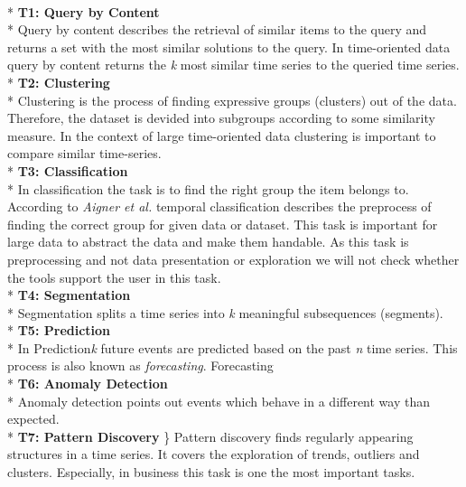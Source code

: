 \\*
\textbf{T1: Query by Content}
\\*
Query by content describes the retrieval of similar items to the query and returns a set with the most similar solutions to the query. In time-oriented data query by content returns the \textit{k} most similar time series to the queried time series.
\\*
\textbf{T2: Clustering}\\*
Clustering is the process of finding expressive groups (clusters) out of the data. Therefore, the dataset is devided into subgroups according to some similarity measure. In the context of large time-oriented data clustering is important to compare similar time-series.
\\*
\textbf{T3: Classification}\\*
In classification the task is to find the right group the item belongs to. According to \textit{Aigner et al.} temporal classification describes the preprocess of finding the correct group for given data or dataset. This task is important for large data to abstract the data and make them handable. As this task is preprocessing and not data presentation or exploration we will not check whether the tools support the user in this task. 
\\*
\textbf{T4: Segmentation}\\*
Segmentation splits a time series into \textit{k} meaningful subsequences (segments)\cite{batyrshin2007perception}. 
\\*
\textbf{T5: Prediction}\\*
In Prediction\textit{k} future events are predicted based on the past \textit{n} time series. This process is also known as \textit{forecasting}. Forecasting 
\\*
\textbf{T6: Anomaly Detection} \\*
Anomaly detection points out events which behave in a different way than expected.
\\*
\textbf{T7: Pattern Discovery} \}\*
Pattern discovery finds regularly appearing structures in a time series.  It covers the exploration of trends, outliers and clusters. Especially, in business this task is one the most important tasks.


